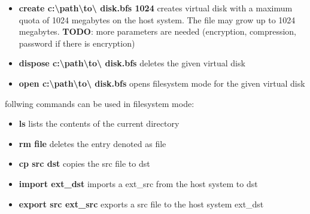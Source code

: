 \begin{itemize}
  \item{\textbf{create c:\textbackslash path\textbackslash to\textbackslash
  disk.bfs 1024}} creates virtual disk with a maximum quota of 1024 megabytes on the host system. The file may grow up to 1024 megabytes.
  \textbf{TODO}: more parameters are needed (encryption, compression, password if there is encryption)
  \item {\textbf{dispose c:\textbackslash path\textbackslash to\textbackslash
  disk.bfs}} deletes the given virtual disk
  \item {\textbf{open c:\textbackslash path\textbackslash to\textbackslash
  disk.bfs}} opens filesystem mode for the given virtual disk
\end{itemize}

follwing commands can be used in filesystem mode:

\begin{itemize}
  \item {\textbf{ls}} lists the contents of the current directory
  \item {\textbf{rm file}} deletes the entry denoted as file
  \item {\textbf{cp src dst}} copies the src file to dst 
  \item {\textbf{import ext\_dst}} imports a ext\_src from the host system to dst
  \item {\textbf{export src ext\_src}} exports a src file to the host system
  ext\_dst
\end{itemize}


